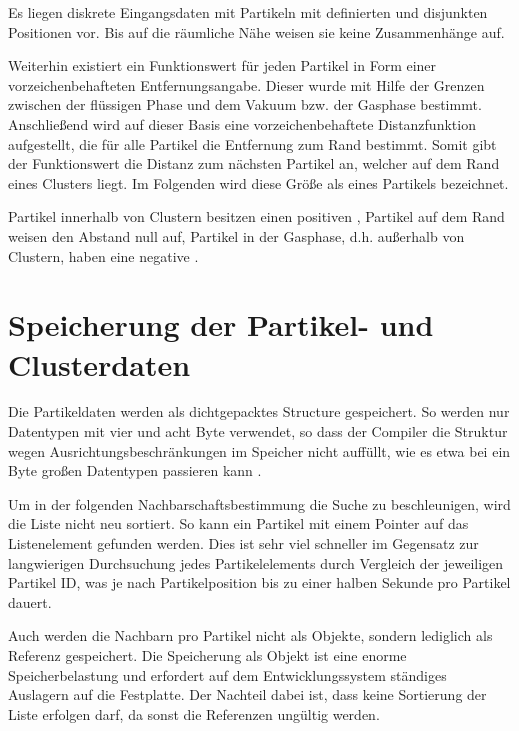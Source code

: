 Es liegen diskrete Eingangsdaten mit Partikeln mit definierten und disjunkten Positionen vor. Bis auf die räumliche Nähe weisen sie keine Zusammenhänge auf.

Weiterhin existiert ein Funktionswert für jeden Partikel in Form einer vorzeichenbehafteten Entfernungsangabe. Dieser wurde mit Hilfe der Grenzen zwischen der flüssigen Phase und dem Vakuum bzw. der Gasphase bestimmt. Anschließend wird auf dieser Basis eine vorzeichenbehaftete Distanzfunktion aufgestellt, die für alle Partikel die Entfernung zum Rand bestimmt. Somit gibt der Funktionswert die Distanz zum nächsten Partikel an, welcher auf dem Rand eines Clusters liegt. Im Folgenden wird diese Größe als  eines Partikels bezeichnet.

Partikel innerhalb von Clustern besitzen einen positiven , Partikel auf dem Rand weisen den Abstand null auf, Partikel in der Gasphase, d.h. außerhalb von Clustern, haben eine negative .


\section{Speicherung der Partikel- und Clusterdaten}


Die Partikeldaten werden als dichtgepacktes Structure gespeichert. So werden nur Datentypen mit vier und acht Byte verwendet, so dass der Compiler die Struktur wegen Ausrichtungsbeschränkungen im Speicher nicht auffüllt, wie es etwa bei ein Byte großen Datentypen passieren kann \cite{raymond1994cAlignment}.

Um in der folgenden Nachbarschaftsbestimmung die Suche zu beschleunigen, wird die Liste nicht neu sortiert. So kann ein Partikel mit einem Pointer auf das Listenelement gefunden werden. Dies ist sehr viel schneller im Gegensatz zur langwierigen Durchsuchung jedes Partikelelements durch Vergleich der jeweiligen Partikel ID, was je nach Partikelposition bis zu einer halben Sekunde pro Partikel dauert.

Auch werden die Nachbarn pro Partikel nicht als Objekte, sondern lediglich als Referenz gespeichert. Die Speicherung als Objekt ist eine enorme Speicherbelastung und erfordert auf dem Entwicklungssystem ständiges Auslagern auf die Festplatte. Der Nachteil dabei ist, dass keine Sortierung der Liste erfolgen darf, da sonst die Referenzen ungültig werden.

